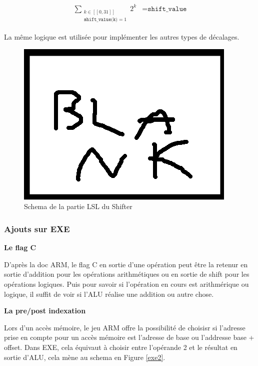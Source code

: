 \documentclass{article}
\begin{document}
\begin{eqnarray*}
  \sum_{\substack{k \in [[0, 31]] \\ \texttt{shift\_value(k)} = 1}} 2^k &= \texttt{shift\_value}
\end{eqnarray*}

La même logique est utilisée pour implémenter les autres types de décalages.

\begin{figure}[H]
\includegraphics[scale=1]{pics/blank.png}
\centering
\caption{Schema de la partie LSL du Shifter}
\label{shifter_lsl}
\end{figure}



\subsubsection{Ajouts sur EXE}

\textbf{Le flag C}

D'après la doc ARM, le flag C en sortie d'une opération peut être la retenur en sortie d'addition
pour les opérations arithmétiques ou en sortie de shift pour les opérations logiques.
Puis pour savoir si l'opération en cours est arithmérique ou logique, il suffit de voir si
l'ALU réalise une addition ou autre chose.

\textbf{La pre/post indexation}

Lors d'un accès mémoire, le jeu ARM offre la possibilité de choisisr si l'adresse prise en compte
pour un accès mémoire est l'adresse de base ou l'addresse base + offset.
Dans EXE, cela équivaut à choisir entre l'opérande 2 et le résultat en sortie d'ALU,
cela mène au schema en Figure \ref{exe2}.
\end{document}
